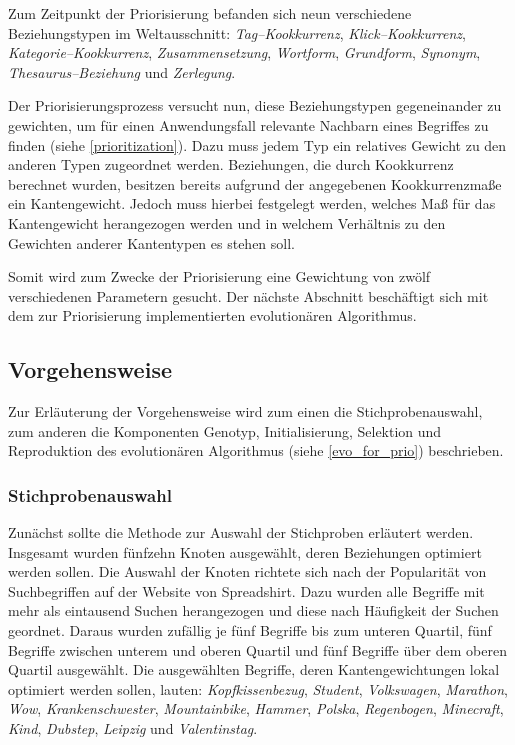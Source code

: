 Zum Zeitpunkt der Priorisierung befanden sich neun verschiedene Beziehungstypen im Weltausschnitt: \emph{Tag--Kookkurrenz}, \emph{Klick--Kookkurrenz}, \emph{Kategorie--Kookkurrenz}, \emph{Zusammensetzung}, \emph{Wortform}, \emph{Grundform}, \emph{Synonym}, \emph{Thesaurus--Beziehung} und \emph{Zerlegung}.

Der Priorisierungsprozess versucht nun, diese Beziehungstypen gegeneinander zu gewichten, um für einen Anwendungsfall relevante Nachbarn eines Begriffes zu finden (siehe \cref{prioritization}). Dazu muss jedem Typ ein relatives Gewicht zu den anderen Typen zugeordnet werden. Beziehungen, die durch Kookkurrenz berechnet wurden, besitzen bereits aufgrund der angegebenen Kookkurrenzmaße ein Kantengewicht. Jedoch muss hierbei festgelegt werden, welches Maß für das Kantengewicht herangezogen werden und in welchem Verhältnis zu den Gewichten anderer Kantentypen es stehen soll.

Somit wird zum Zwecke der Priorisierung eine Gewichtung von zwölf verschiedenen Parametern gesucht. Der nächste Abschnitt beschäftigt sich mit dem zur Priorisierung implementierten evolutionären Algorithmus.

\subsection{Vorgehensweise}
\label{evo_implementation}

Zur Erläuterung der Vorgehensweise wird zum einen die Stichprobenauswahl, zum anderen die Komponenten Genotyp, Initialisierung, Selektion und Reproduktion des evolutionären Algorithmus (siehe \cref{evo_for_prio}) beschrieben.

\subsubsection{Stichprobenauswahl}

Zunächst sollte die Methode zur Auswahl der Stichproben erläutert werden. Insgesamt wurden fünfzehn Knoten ausgewählt, deren Beziehungen optimiert werden sollen. Die Auswahl der Knoten richtete sich nach der Popularität von Suchbegriffen auf der Website von Spreadshirt. Dazu wurden alle Begriffe mit mehr als eintausend Suchen herangezogen und diese nach Häufigkeit der Suchen geordnet. Daraus wurden zufällig je fünf Begriffe bis zum unteren Quartil, fünf Begriffe zwischen unterem und oberen Quartil und fünf Begriffe über dem oberen Quartil ausgewählt. Die ausgewählten Begriffe, deren Kantengewichtungen lokal optimiert werden sollen, lauten: \emph{Kopfkissenbezug}, \emph{Student}, \emph{Volkswagen}, \emph{Marathon}, \emph{Wow}, \emph{Krankenschwester}, \emph{Mountainbike}, \emph{Hammer}, \emph{Polska}, \emph{Regenbogen}, \emph{Minecraft}, \emph{Kind}, \emph{Dubstep}, \emph{Leipzig} und \emph{Valentinstag}.

